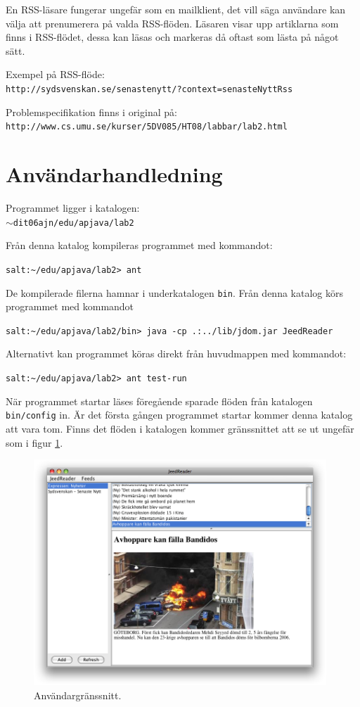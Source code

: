 \documentclass[titlepage, twoside, a4paper, 12pt]{article}
\def\pathtocode{$\sim$dit06ajn/edu/apjava/lab2}
\begin{document}
En RSS-läsare fungerar ungefär som en mailklient, det vill säga
användare kan välja att prenumerera på valda RSS-flöden. Läsaren visar
upp artiklarna som finns i RSS-flödet, dessa kan läsas och markeras då
oftast som lästa på något sätt.

Exempel på RSS-flöde:\\
\verb!http://sydsvenskan.se/senastenytt/?context=senasteNyttRss!

Problemspecifikation finns i original på:\\
\verb!http://www.cs.umu.se/kurser/5DV085/HT08/labbar/lab2.html!

\section{Användarhandledning}\label{Anvandarhandledning}
Programmet ligger i katalogen:\\
\texttt{\pathtocode}

Från denna katalog kompileras programmet med kommandot:

\verb!salt:~/edu/apjava/lab2> ant!

De kompilerade filerna hamnar i underkatalogen \verb!bin!. Från denna
katalog körs programmet med kommandot

\verb!salt:~/edu/apjava/lab2/bin> java -cp .:../lib/jdom.jar JeedReader!

Alternativt kan programmet köras direkt från huvudmappen med
kommandot:

\verb!salt:~/edu/apjava/lab2> ant test-run!

När programmet startar läses föregående sparade flöden från katalogen
\verb!bin/config! in. Är det första gången programmet startar kommer
denna katalog att vara tom. Finns det flöden i katalogen kommer
gränssnittet att se ut ungefär som i figur \ref{fig:gui-out}.

\begin{figure}[H]
  \begin{center}
    \includegraphics[width=110mm]{images/gui-out.png}
    \caption{Användargränssnitt.}
    \label{fig:gui-out}
  \end{center}
\end{figure}
\end{document}
